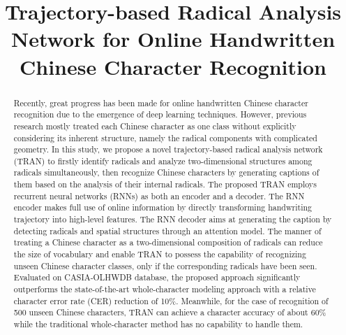 \documentclass[a4paper,conference]{IEEEtran}
\begin{document}
%
\title{Trajectory-based Radical Analysis Network for Online Handwritten Chinese Character Recognition}


\author{
}



\maketitle

\begin{abstract}
  Recently, great progress has been made for online handwritten Chinese character recognition due to the emergence of deep learning techniques. However, previous research mostly treated each Chinese character as one class without explicitly considering its inherent structure, namely the radical components with complicated geometry. In this study, we propose a novel trajectory-based radical analysis network (TRAN) to firstly identify radicals and analyze two-dimensional structures among radicals simultaneously, then recognize Chinese characters by generating captions of them based on the analysis of their internal radicals. The proposed TRAN employs recurrent neural networks (RNNs) as both an encoder and a decoder. The RNN encoder makes full use of online information by directly transforming handwriting trajectory into high-level features. The RNN decoder aims at generating the caption by detecting radicals and spatial structures through an attention model. The manner of treating a Chinese character as a two-dimensional composition of radicals can reduce the size of vocabulary and enable TRAN to possess the capability of recognizing unseen Chinese character classes, only if the corresponding radicals have been seen. Evaluated on CASIA-OLHWDB database, the proposed approach significantly outperforms the state-of-the-art whole-character modeling approach with a relative character error rate (CER) reduction of 10\%. Meanwhile, for the case of recognition of 500 unseen Chinese characters, TRAN can achieve a character accuracy of about 60\% while the traditional whole-character method has no capability to handle them.
\end{abstract}
\end{document}
